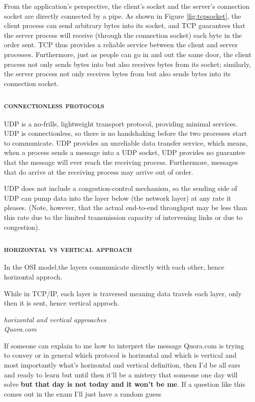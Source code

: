 \documentclass[a4paper,12pt]{book}
\begin{document}
From the application’s perspective, the client’s socket and the server’s connection socket are directly connected by a pipe. As shown in Figure \ref{fig:tcpsocket}, the client process can send arbitrary bytes into its socket, and TCP guarantees that the server process will receive (through the connection socket) each byte in the order sent. TCP thus provides a reliable service between the client and server processes.
Furthermore, just as people can go in and out the same door, the client process not only sends bytes into but also receives bytes from its socket; similarly, the server process not only receives bytes from but also sends bytes into its connection socket.

\subsubsection{\textsc{connectionless protocols}}

UDP is a no-frills, lightweight transport protocol, providing minimal services. UDP is connectionless, so there is no handshaking before the two processes start to communicate. UDP provides an unreliable data transfer service, which means, when a process sends a message into a UDP socket, UDP provides no guarantee that the message will ever reach the receiving process. Furthermore, messages that do arrive at the
receiving process may arrive out of order.

UDP does not include a congestion-control mechanism, so the sending side of UDP can pump data into the layer below (the network layer) at any rate it pleases. (Note, however, that the actual end-to-end throughput may be less than this rate due to the limited transmission capacity of intervening links or due to congestion).


\subsubsection{\textsc{horizontal vs vertical approach}}

\epigraph{In the OSI model,the layers communicate directly with each other, hence horizontal approch.

While in TCP/IP, each layer is traversed meaning data travels each layer, only then it is sent, hence vertical approch.}{\textit{horizontal and vertical approaches \\Quora.com}}

\noindent If someone can explain to me how to interpret the message Quora.com is trying to convey or in general which protocol is horizontal and which is vertical and most importantly what's horizontal and vertical definition, then I'd be all ears and ready to learn but until then it'll be a mistery that someone one day will solve \textbf{but that day is not today and it won't be me}. If a question like this comes out in the exam I'll just have a random guess
\end{document}
